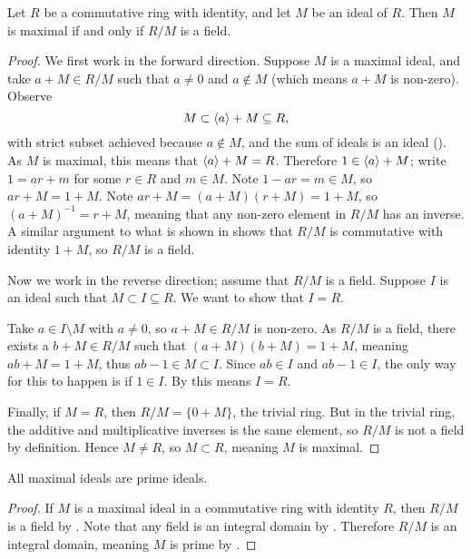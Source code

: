 \begin{theorem}\label{thrm-maximal-ideal-iff-quotient-ring-is-field}
    Let $R$ be a commutative ring with identity, and let $M$ be an ideal of $R$. Then $M$ is maximal if and only if $R/M$ is a field.
\end{theorem}
\begin{proof}
    We first work in the forward direction. Suppose $M$ is a maximal ideal, and take $a + M \in R/M$ such that $a \neq 0$ and $a \notin M$ (which means $a + M$ is non-zero). Observe
    \[
        M \subset \left\langle a\right\rangle + M \subseteq R,
    \]
    with strict subset achieved because $a \notin M$, and the sum of ideals is an ideal (). As $M$ is maximal, this means that $\left\langle a\right\rangle + M = R$. Therefore $1 \in \left\langle a\right\rangle + M$; write $1 = ar + m$ for some $r \in R$ and $m \in M$. Note $1-ar = m \in M$, so $ar + M = 1 + M$. Note $ar + M = (a+M)(r+M) = 1 + M$, so $(a+M)^{-1} = r+M$, meaning that any non-zero element in $R/M$ has an inverse. A similar argument to what is shown in  shows that $R/M$ is commutative with identity $1 + M$, so $R/M$ is a field.

    Now we work in the reverse direction; assume that $R/M$ is a field. Suppose $I$ is an ideal such that $M \subset I \subseteq R$. We want to show that $I = R$.

    Take $a \in I \setminus M$ with $a \neq 0$, so $a + M \in R/M$ is non-zero. As $R/M$ is a field, there exists a $b + M \in R/M$ such that $(a+M)(b+M) = 1 + M$, meaning $ab+M = 1+M$, thus $ab - 1 \in M \subset I$. Since $ab \in I$ and $ab - 1 \in I$, the only way for this to happen is if $1 \in I$. By  this means $I = R$.

    Finally, if $M = R$, then $R/M = \{0 + M\}$, the trivial ring. But in the trivial ring, the additive and multiplicative inverses is the same element, so $R/M$ is not a field by definition. Hence $M \neq R$, so $M \subset R$, meaning $M$ is maximal.
\end{proof}

\begin{corollary}\label{corollary-all-maximal-ideals-are-prime-ideals}
    All maximal ideals are prime ideals.
\end{corollary}
\begin{proof}
    If $M$ is a maximal ideal in a commutative ring with identity $R$, then $R/M$ is a field by . Note that any field is an integral domain by . Therefore $R/M$ is an integral domain, meaning $M$ is prime by .
\end{proof}

